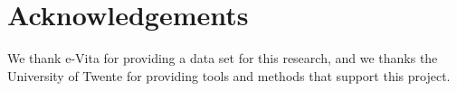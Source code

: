 \section{Acknowledgements}
We thank e-Vita for providing a data set for this research, and we thanks the University of Twente for providing tools and methods that support this project.